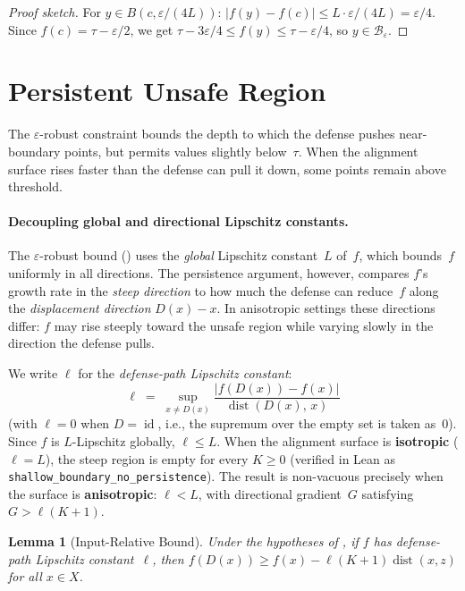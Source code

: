 \documentclass[11pt]{article}
\newtheorem{lemma}[theorem]{Lemma}
\newcommand{\id}{\operatorname{id}}
\newcommand{\dist}{\operatorname{dist}}
\begin{document}
\begin{proof}[Proof sketch]
For $y \in B(c, \varepsilon/(4L))$: $|f(y) - f(c)| \leq L \cdot \varepsilon/(4L) = \varepsilon/4$. Since $f(c) = \tau - \varepsilon/2$, we get $\tau - 3\varepsilon/4 \leq f(y) \leq \tau - \varepsilon/4$, so $y \in \mathcal{B}_\varepsilon$.
\end{proof}

\section{Persistent Unsafe Region}
\label{sec:persistent}

The $\varepsilon$-robust constraint bounds the depth to which the
defense pushes near-boundary points, but permits values slightly
below~$\tau$. When the alignment surface rises faster than the
defense can pull it down, some points remain above threshold.

\paragraph{Decoupling global and directional Lipschitz constants.}
The $\varepsilon$-robust bound () uses the
\emph{global} Lipschitz constant~$L$ of~$f$, which bounds~$f$
uniformly in all directions. The persistence argument, however,
compares $f$'s growth rate in the \emph{steep direction} to how much
the defense can reduce~$f$ along the \emph{displacement direction}
$D(x) - x$. In anisotropic settings these directions differ: $f$ may
rise steeply toward the unsafe region while varying slowly in the
direction the defense pulls.

We write $\ell$ for the \emph{defense-path Lipschitz constant}:
\[
  \ell \;=\; \sup_{x \neq D(x)}
    \frac{|f(D(x)) - f(x)|}{\dist(D(x),\, x)}
\]
(with $\ell = 0$ when $D = \id$, i.e., the supremum over the empty
set is taken as~$0$).
Since $f$ is $L$-Lipschitz globally, $\ell \leq L$. When the
alignment surface is \textbf{isotropic} ($\ell = L$), the steep region
is empty for every $K \geq 0$ (verified in Lean as
\texttt{shallow\_boundary\_no\_persistence}). The result is
non-vacuous precisely when the surface is \textbf{anisotropic}:
$\ell < L$, with directional gradient~$G$ satisfying
$G > \ell(K+1)$.

\begin{lemma}[Input-Relative Bound]
\label{lem:input-bound}
Under the hypotheses of , if $f$ has
defense-path Lipschitz constant~$\ell$, then
$f(D(x)) \geq f(x) - \ell(K+1)\dist(x,z)$
for all $x \in X$.
\end{lemma}
\end{document}
